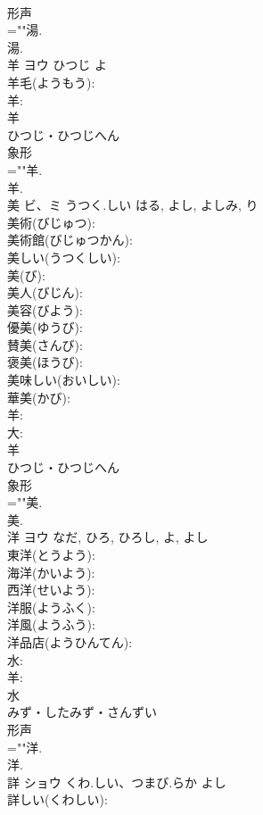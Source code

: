 \documentclass[8pt]{extreport}
\begin{document}
\begin{CJK}{UTF8}{min}
\\	形声 
\\	=""湯.
\\	湯.
\\	羊	ヨウ	ひつじ	よ	
\\	羊毛(ようもう): 
\\	羊: 
\\	羊	
\\	ひつじ・ひつじへん	
\\	象形 
\\	=""羊.
\\	羊.
\\	美	ビ、ミ	うつく.しい	はる, よし, よしみ, り	
\\	美術(びじゅつ): 
\\	美術館(びじゅつかん): 
\\	美しい(うつくしい): 
\\	美(び): 
\\	美人(びじん): 
\\	美容(びよう): 
\\	優美(ゆうび): 
\\	賛美(さんび): 
\\	褒美(ほうび): 
\\	美味しい(おいしい): 
\\	華美(かび): 
\\	羊: 
\\	大: 
\\	羊	
\\	ひつじ・ひつじへん	
\\	象形 
\\	=""美.
\\	美.
\\	洋	ヨウ		なだ, ひろ, ひろし, よ, よし	
\\	東洋(とうよう): 
\\	海洋(かいよう): 
\\	西洋(せいよう): 
\\	洋服(ようふく): 
\\	洋風(ようふう): 
\\	洋品店(ようひんてん): 
\\	水: 
\\	羊: 
\\	水	
\\	みず・したみず・さんずい	
\\	形声 
\\	=""洋.
\\	洋.
\\	詳	ショウ	くわ.しい、つまび.らか	よし	
\\	詳しい(くわしい): 

\end{CJK}
\end{document}
